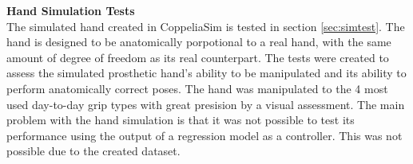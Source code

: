 \documentclass[../main.tex]{subfiles}
\begin{document}
\textbf{Hand Simulation Tests}\\
The simulated hand created in CoppeliaSim \cite{coppeliasim} is tested in section \ref{sec:simtest}.
The hand is designed to be anatomically porpotional to a real hand, with the same amount of degree of freedom as its real counterpart.
The tests were created to assess the simulated prosthetic hand's ability to be manipulated and its ability to perform anatomically correct poses.
The hand was manipulated to the 4 most used day-to-day grip types with great presision by a visual assessment.
The main problem with the hand simulation is that it was not possible to test its performance using the output of a regression model as a controller.
This was not possible due to the created dataset.






\end{document}
